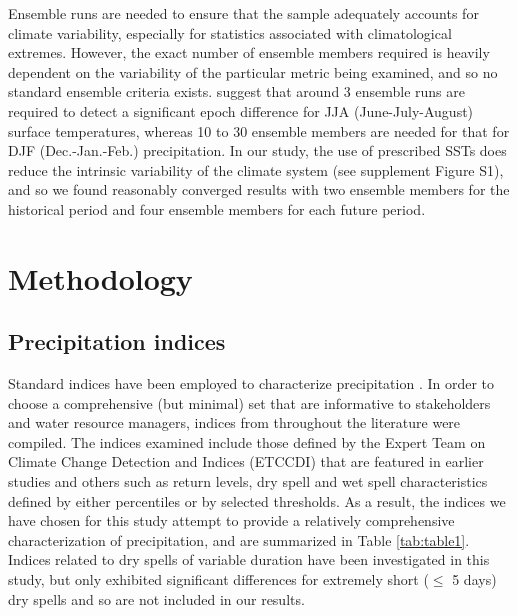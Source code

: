 Ensemble runs are needed to ensure that the sample adequately accounts for climate variability, especially for statistics associated with climatological extremes. However, the exact number of ensemble members required is heavily dependent on the variability of the particular metric being examined, and so no standard ensemble criteria exists. \cite{deser2012uncertainty} suggest that around 3 ensemble runs are required to detect a significant epoch difference for JJA (June-July-August) surface temperatures, whereas 10 to 30 ensemble members are needed for that for DJF (Dec.-Jan.-Feb.) precipitation. In our study, the use of prescribed SSTs does reduce the intrinsic variability of the climate system (see supplement Figure S1), and so we found reasonably converged results with two ensemble members for the historical period and four ensemble members for each future period.


\section{Methodology} \label{sec:Methodology}

\subsection{Precipitation indices}

Standard indices have been employed to characterize precipitation \cite{tebaldi2006going, zhang2011indices, sillmann2013climate}. In order to choose a comprehensive (but minimal) set that are informative to stakeholders and water resource managers, indices from throughout the literature were compiled.  The indices examined include those defined by the Expert Team on Climate Change Detection and Indices (ETCCDI) \cite{karl1999clivar} that are featured in earlier studies \cite{duliere2011extreme, sillmann2013climate, diffenbaugh2005fine, singh2013precipitation} and others such as return levels, dry spell and wet spell characteristics defined by either percentiles or by selected thresholds. As a result, the indices we have chosen for this study attempt to provide a relatively comprehensive characterization of precipitation, and are summarized in Table \ref{tab:table1}. Indices related to dry spells of variable duration have been investigated in this study, but only exhibited significant differences for extremely short ($\leq$ 5 days) dry spells and so are not included in our results.

